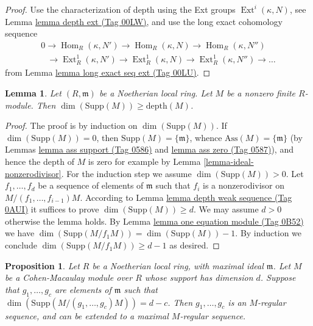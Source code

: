 \documentclass{amsart}
\theoremstyle{plain}
\newtheorem{proposition}[subsection]{Proposition}
\newtheorem{lemma}[subsection]{Lemma}
\theoremstyle{definition}
\theoremstyle{remark}
\numberwithin{equation}{subsection}
\def\Hom{\mathop{\mathrm{Hom}}\nolimits}
\def\Ext{\mathop{\mathrm{Ext}}\nolimits}
\begin{document}
\begin{proof}
Use the characterization of depth using the Ext groups
$\Ext^i(\kappa, N)$, see Lemma \href{https://stacks.math.columbia.edu/tag/00LW}{lemma depth ext (Tag 00LW)},
and use the long exact cohomology sequence
$$
\begin{matrix}
0
\to \Hom_R(\kappa, N')
\to \Hom_R(\kappa, N)
\to \Hom_R(\kappa, N'')
\\
\phantom{0\ }
\to \Ext^1_R(\kappa, N')
\to \Ext^1_R(\kappa, N)
\to \Ext^1_R(\kappa, N'')
\to \ldots
\end{matrix}
$$
from Lemma \href{https://stacks.math.columbia.edu/tag/00LU}{lemma long exact seq ext (Tag 00LU)}.
\end{proof}


\begin{lemma}
\label{lemma-bound-depth}
Let $(R, \mathfrak m)$ be a Noetherian local ring.
Let $M$ be a nonzero finite $R$-module.
Then $\dim(\text{Supp}(M)) \geq \text{depth}(M)$.
\end{lemma}

\begin{proof}
The proof is by induction on $\dim(\text{Supp}(M))$.
If $\dim(\text{Supp}(M)) = 0$, then
$\text{Supp}(M) = \{\mathfrak m\}$, whence $\text{Ass}(M) = \{\mathfrak m\}$
(by Lemmas \href{https://stacks.math.columbia.edu/tag/0586}{lemma ass support (Tag 0586)} and \href{https://stacks.math.columbia.edu/tag/0587}{lemma ass zero (Tag 0587)}), and hence
the depth of $M$ is zero for example by
Lemma \ref{lemma-ideal-nonzerodivisor}.
For the induction step we assume $\dim(\text{Supp}(M)) > 0$.
Let $f_1, \ldots, f_d$ be a sequence of elements of $\mathfrak m$
such that $f_i$ is a nonzerodivisor on $M/(f_1, \ldots, f_{i - 1})M$.
According to Lemma \href{https://stacks.math.columbia.edu/tag/0AUI}{lemma depth weak sequence (Tag 0AUI)} it suffices to prove
$\dim(\text{Supp}(M)) \geq d$. We may assume
$d > 0$ otherwise the lemma holds. By
Lemma \href{https://stacks.math.columbia.edu/tag/0B52}{lemma one equation module (Tag 0B52)}
we have $\dim(\text{Supp}(M/f_1M)) = \dim(\text{Supp}(M)) - 1$.
By induction we conclude $\dim(\text{Supp}(M/f_1M)) \geq d - 1$
as desired.
\end{proof}


\begin{proposition}
\label{proposition-CM-module}
Let $R$ be a Noetherian local ring, with maximal ideal $\mathfrak m$.
Let $M$ be a Cohen-Macaulay module over $R$ whose support has dimension $d$.
Suppose that $g_1, \ldots, g_c$ are elements of
$\mathfrak m$ such that $\dim(\text{Supp}(M/(g_1, \ldots, g_c)M))
= d - c$. Then $g_1, \ldots, g_c$ is an $M$-regular sequence,
and can be extended to a maximal $M$-regular sequence.
\end{proposition}
\end{document}
